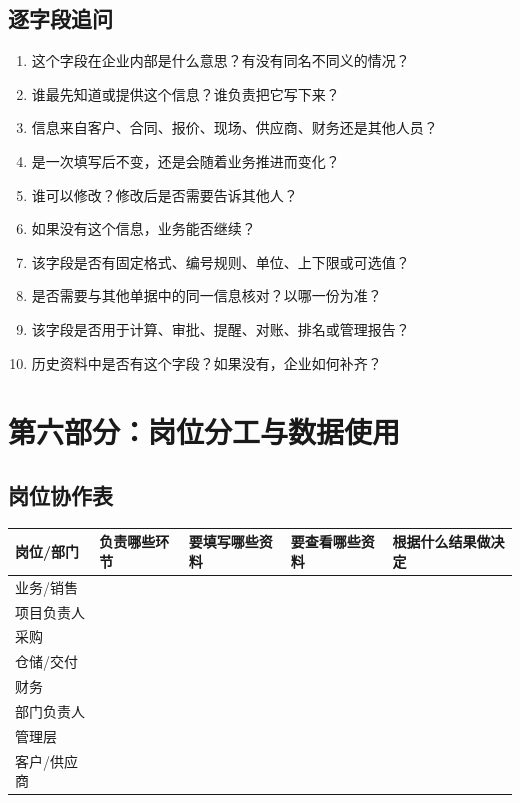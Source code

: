 \documentclass[UTF8,a4paper,11pt]{ctexart}
\begin{document}
\subsection{逐字段追问}
\begin{enumerate}
  \item 这个字段在企业内部是什么意思？有没有同名不同义的情况？
  \item 谁最先知道或提供这个信息？谁负责把它写下来？
  \item 信息来自客户、合同、报价、现场、供应商、财务还是其他人员？
  \item 是一次填写后不变，还是会随着业务推进而变化？
  \item 谁可以修改？修改后是否需要告诉其他人？
  \item 如果没有这个信息，业务能否继续？
  \item 该字段是否有固定格式、编号规则、单位、上下限或可选值？
  \item 是否需要与其他单据中的同一信息核对？以哪一份为准？
  \item 该字段是否用于计算、审批、提醒、对账、排名或管理报告？
  \item 历史资料中是否有这个字段？如果没有，企业如何补齐？
\end{enumerate}

\section{第六部分：岗位分工与数据使用}
\subsection{岗位协作表}
\begin{longtable}{p{}p{}p{}p{}p{}}
\toprule
岗位/部门 & 负责哪些环节 & 要填写哪些资料 & 要查看哪些资料 & 根据什么结果做决定 \\
\midrule
业务/销售 & & & & \\
项目负责人 & & & & \\
采购 & & & & \\
仓储/交付 & & & & \\
财务 & & & & \\
部门负责人 & & & & \\
管理层 & & & & \\
客户/供应商 & & & & \\
\bottomrule
\end{longtable}
\end{document}
